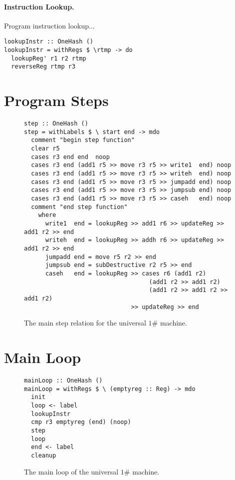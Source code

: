 \documentclass[10pt, preprint, nocopyrightspace]{sigplanconf}
\newcommand{\oh}{$1\#$\xspace}
\begin{document}
\paragraph{Instruction Lookup.}

Program instruction lookup...

\begin{lstlisting}
lookupInstr :: OneHash ()
lookupInstr = withRegs $ \rtmp -> do
  lookupReg' r1 r2 rtmp
  reverseReg rtmp r3
\end{lstlisting}

\section{Program Steps}

\begin{figure*}
\begin{lstlisting}
step :: OneHash () 
step = withLabels $ \ start end -> mdo 
  comment "begin step function" 
  clear r5 
  cases r3 end end  noop 
  cases r3 end (add1 r5 >> move r3 r5 >> write1  end) noop 
  cases r3 end (add1 r5 >> move r3 r5 >> writeh  end) noop 
  cases r3 end (add1 r5 >> move r3 r5 >> jumpadd end) noop 
  cases r3 end (add1 r5 >> move r3 r5 >> jumpsub end) noop 
  cases r3 end (add1 r5 >> move r3 r5 >> caseh   end) noop 
  comment "end step function" 
    where 
      write1  end = lookupReg >> add1 r6 >> updateReg >> add1 r2 >> end 
      writeh  end = lookupReg >> addh r6 >> updateReg >> add1 r2 >> end 
      jumpadd end = move r5 r2 >> end 
      jumpsub end = subDestructive r2 r5 >> end 
      caseh   end = lookupReg >> cases r6 (add1 r2) 
                                   (add1 r2 >> add1 r2) 
                                   (add1 r2 >> add1 r2 >> add1 r2) 
                              >> updateReg >> end 
\end{lstlisting}
\caption{The main step relation for the universal \oh machine.}
\end{figure*}

\section{Main Loop}

\begin{figure}
\begin{lstlisting}
mainLoop :: OneHash ()
mainLoop = withRegs $ \ (emptyreg :: Reg) -> mdo
  init
  loop <- label
  lookupInstr
  cmp r3 emptyreg (end) (noop)
  step
  loop
  end <- label
  cleanup
\end{lstlisting}
\caption{The main loop of the universal \oh machine.}
\end{figure}
\end{document}
